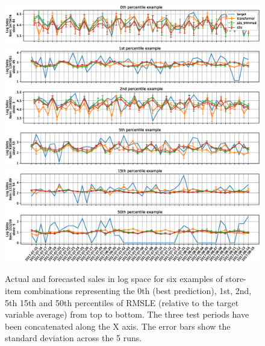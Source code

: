 \documentclass{elsarticle}
\begin{document}
	\begin{figure}
		\centering
		\includegraphics[width=1\linewidth]{img/sample_0_log}
		\includegraphics[width=1\linewidth]{img/sample_1_log}
		\includegraphics[width=1\linewidth]{img/sample_2_log}
		\includegraphics[width=1\linewidth]{img/sample_3_log}
		\includegraphics[width=1\linewidth]{img/sample_4_log}
		\includegraphics[width=1\linewidth]{img/sample_5_log}
	\caption{Actual and forecasted sales in log space for six examples of store-item combinations representing the 0th (best prediction), 1st, 2nd, 5th 15th and 50th percentiles of RMSLE (relative to the target variable average) from top to bottom. The three test periods have been concatenated along the X axis. The error bars show the standard deviation across the 5 runs.}
		\label{fig:ts_log}
	\end{figure}
\end{document}
